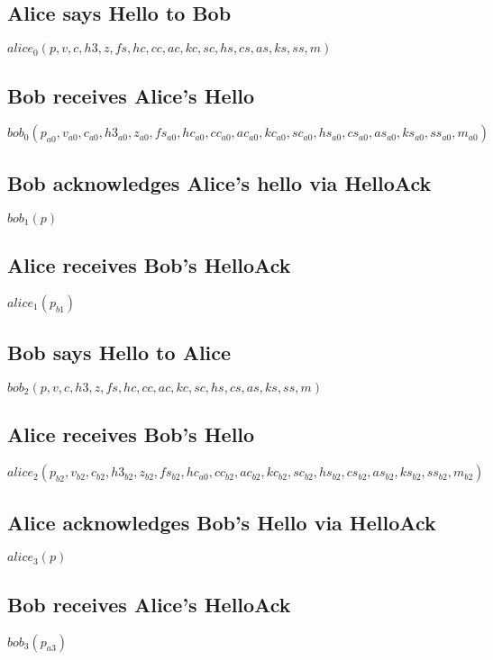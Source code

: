 \documentclass[11pt]{article}
\begin{document}
  \subsection*{Alice says Hello to Bob}
   $alice_0(p,v,c,h3,z,fs,hc,cc,ac,kc,sc,hs,cs,as,ks,ss,m)$
  \subsection*{Bob receives Alice's Hello}
   $bob_0(p_{a0},v_{a0},c_{a0},h3_{a0},z_{a0},fs_{a0},hc_{a0}
     ,cc_{a0},ac_{a0},kc_{a0},sc_{a0},hs_{a0},cs_{a0}
          ,as_{a0},ks_{a0},ss_{a0},m_{a0})$
  \subsection*{Bob acknowledges Alice's hello via HelloAck}
  $bob_1(p)$
  \subsection*{Alice receives Bob's HelloAck}
  $alice_1(p_{b1})$
  \subsection*{Bob says Hello to Alice}
  $bob_2(p,v,c,h3,z,fs,hc,cc,ac,kc,sc,hs,cs,as,ks,ss,m)$
  \subsection*{Alice receives Bob's Hello}
   $alice_2(p_{b2},v_{b2},c_{b2},h3_{b2},z_{b2},fs_{b2},hc_{a0}
     ,cc_{b2},ac_{b2},kc_{b2},sc_{b2},hs_{b2},cs_{b2}
          ,as_{b2},ks_{b2},ss_{b2},m_{b2})$
  \subsection*{Alice acknowledges Bob's Hello via HelloAck}
  $alice_3(p)$
  \subsection*{Bob receives Alice's HelloAck}
  $bob_3(p_{a3})$
\end{document}
